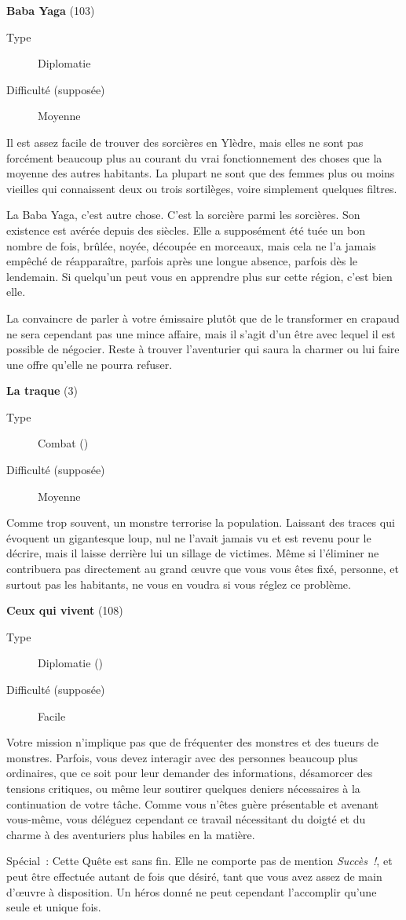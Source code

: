 \documentclass{report}
\newcommand{\quest}[5]{
    \begin{mdframed}[innertopmargin=0.5cm,innerbottommargin=0.5cm,leftmargin=0.5cm,rightmargin=0.5cm]
        \begin{center}
            \textbf{#1} (#2)
        \end{center}
        \begin{description}
            \item[Type] #3
            \item[Difficulté (supposée)] #4
        \end{description}
        #5
    \end{mdframed}
}
\begin{document}
\quest{Baba Yaga}{103}{Diplomatie}{Moyenne}{
Il est assez facile de trouver des sorcières en Ylèdre, mais elles ne sont pas forcément beaucoup plus au courant du vrai fonctionnement des choses que la moyenne des autres habitants. La plupart ne sont que des femmes plus ou moins vieilles qui connaissent deux ou trois sortilèges, voire simplement quelques filtres.

La Baba Yaga, c'est autre chose. C'est la sorcière parmi les sorcières. Son existence est avérée depuis des siècles. Elle a supposément été tuée un bon nombre de fois, brûlée, noyée, découpée en morceaux, mais cela ne l'a jamais empêché de réapparaître, parfois après une longue absence, parfois dès le lendemain. Si quelqu'un peut vous en apprendre plus sur cette région, c'est bien elle.

La convaincre de parler à votre émissaire plutôt que de le transformer en crapaud ne sera cependant pas une mince affaire, mais il s'agit d'un être avec lequel il est possible de négocier. Reste à trouver l'aventurier qui saura la charmer ou lui faire une offre qu'elle ne pourra refuser.
}

\quest{La traque}{3}{Combat (\caduceus)}{Moyenne}{
Comme trop souvent, un monstre terrorise la population. Laissant des traces qui évoquent un gigantesque loup, nul ne l'avait jamais vu et est revenu pour le décrire, mais il laisse derrière lui un sillage de victimes. Même si l'éliminer ne contribuera pas directement au grand œuvre que vous vous êtes fixé, personne, et surtout pas les habitants, ne vous en voudra si vous réglez ce problème.
}

\clearpage

\quest{Ceux qui vivent}{108}{Diplomatie (\cross)}{Facile}{
Votre mission n'implique pas que de fréquenter des monstres et des tueurs de monstres. Parfois, vous devez interagir avec des personnes beaucoup plus ordinaires, que ce soit pour leur demander des informations, désamorcer des tensions critiques, ou même leur soutirer quelques deniers nécessaires à la continuation de votre tâche. Comme vous n'êtes guère présentable et avenant vous-même, vous déléguez cependant ce travail nécessitant du doigté et du charme à des aventuriers plus habiles en la matière.

Spécial : Cette Quête est sans fin. Elle ne comporte pas de mention \emph{Succès !}, et peut être effectuée autant de fois que désiré, tant que vous avez assez de main d’œuvre à disposition. Un héros donné ne peut cependant l'accomplir qu'une seule et unique fois.
}
\end{document}
